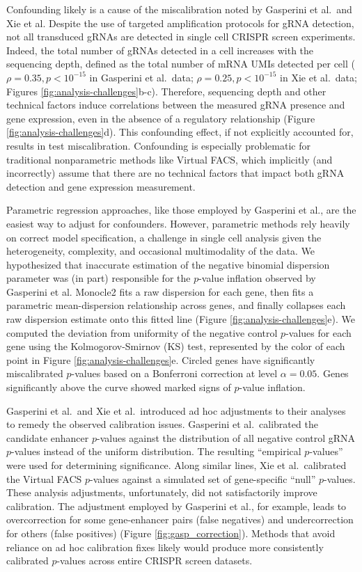 \documentclass{nature}
\begin{document}
Confounding likely is a cause of the miscalibration noted by Gasperini et al.\ and Xie et al. Despite the use of targeted amplification protocols for gRNA detection\cite{Hill2018}, not all transduced gRNAs are detected in single cell CRISPR screen experiments. Indeed, the total number of gRNAs detected in a cell increases with the sequencing depth, defined as the total number of mRNA UMIs detected per cell ($\rho = 0.35, p < 10^{-15}$ in Gasperini et al.\ data; $\rho = 0.25, p < 10^{-15}$ in Xie et al.\ data; Figures \ref{fig:analysis-challenges}b-c). Therefore, sequencing depth and other technical factors induce correlations between the measured gRNA presence and gene expression, even in the absence of a regulatory relationship (Figure \ref{fig:analysis-challenges}d). This confounding effect, if not explicitly accounted for, results in test miscalibration. Confounding is especially problematic for traditional nonparametric methods like Virtual FACS, which implicitly (and incorrectly) assume that there are no technical factors that impact both gRNA detection and gene expression measurement.

Parametric regression approaches, like those employed by Gasperini et al., are the easiest way to adjust for confounders. However, parametric methods rely heavily on correct model specification, a challenge in single cell analysis given the heterogeneity, complexity, and occasional multimodality of the data. We hypothesized that inaccurate estimation of the negative binomial dispersion parameter was (in part) responsible for the $p$-value inflation observed by Gasperini et al. Monocle2 fits a raw dispersion for each gene, then fits a parametric mean-dispersion relationship across genes, and finally collapses each raw dispersion estimate onto this fitted line (Figure \ref{fig:analysis-challenges}e). We computed the deviation from uniformity of the negative control $p$-values for each gene using the Kolmogorov-Smirnov (KS) test, represented by the color of each point in Figure \ref{fig:analysis-challenges}e. Circled genes have significantly miscalibrated $p$-values based on a Bonferroni correction at level $\alpha = 0.05$. Genes significantly above the curve showed marked signs of $p$-value inflation.

Gasperini et al.\ and Xie et al.\ introduced ad hoc adjustments to their analyses to remedy the observed calibration issues. Gasperini et al.\ calibrated the candidate enhancer $p$-values against the distribution of all negative control gRNA $p$-values instead of the uniform distribution. The resulting ``empirical $p$-values'' were used for determining significance. Along similar lines, Xie et al.\ calibrated the Virtual FACS $p$-values against a simulated set of gene-specific ``null'' $p$-values. These analysis adjustments, unfortunately, did not satisfactorily improve calibration. The adjustment employed by Gasperini et al., for example, leads to overcorrection for some gene-enhancer pairs (false negatives) and undercorrection for others (false positives) (Figure \ref{fig:gasp_correction}). Methods that avoid reliance on ad hoc calibration fixes likely would produce more consistently calibrated $p$-values across entire CRISPR screen datasets.
\end{document}
